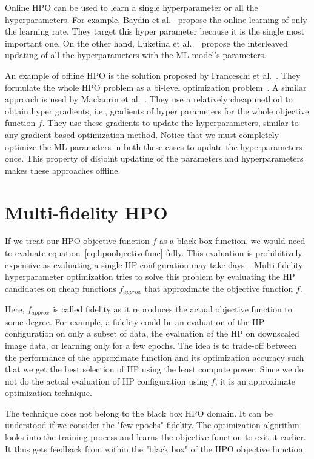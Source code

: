 \documentclass[12pt, twoside, ngerman]{report}
\begin{document}
Online HPO can be used to learn a single hyperparameter or all the hyperparameters. 
For example,  Baydin et al.~\cite{onlineLearningRateUpdate} propose the online learning of only the learning rate. They target this hyper parameter because it is the single most important one. On the other hand, Luketina et al. ~\cite{gradientbasedHPOtuning} propose the interleaved updating of all the hyperparameters with the ML model's parameters.

An example of offline HPO is the solution proposed by Franceschi et al.~\cite{HPOAsBilevelOptimization}. They formulate the whole HPO problem as a bi-level optimization problem~\cite{hutterneuripstutorial}.
A similar approach is used by Maclaurin et al.~\cite{hypergradient}. They use a relatively cheap method to obtain hyper gradients, i.e., gradients of hyper parameters for the whole objective function $f$. They use these gradients to update the hyperparameters, similar to any gradient-based optimization method. Notice that we must completely optimize the ML parameters in both these cases to update the hyperparameters once. This property of disjoint updating of the parameters and hyperparameters makes these approaches offline.


\section{Multi-fidelity HPO}
If we treat our HPO objective function $f$ as a black box function, we would need to evaluate equation~\ref{eq:hpoobjectivefunc} fully.
This evaluation is prohibitively expensive as evaluating a single HP configuration may take days~\cite{hutter2019automated}.
Multi-fidelity hyperparameter optimization tries to solve this problem by evaluating the HP candidates on cheap functions $f_{approx}$ that approximate the objective function $f$.

Here, $f_{approx}$  is called fidelity as it reproduces the actual objective function to some degree.
For example, a fidelity could be an evaluation of the HP configuration on only a subset of data, the evaluation of the HP on downscaled image data, or learning only for a few epochs.
The idea is to trade-off between the performance of the approximate function and its optimization accuracy such that we get the best selection of HP using the least compute power.
Since we do not do the actual evaluation of HP configuration using $f$, it is an approximate optimization technique.

The technique does not belong to the black box HPO domain.
It can be understood if we consider the "few epochs" fidelity.
The optimization algorithm looks into the training process and learns the objective function to exit it earlier.
It thus gets feedback from within the "black box" of the HPO objective function.
\end{document}
